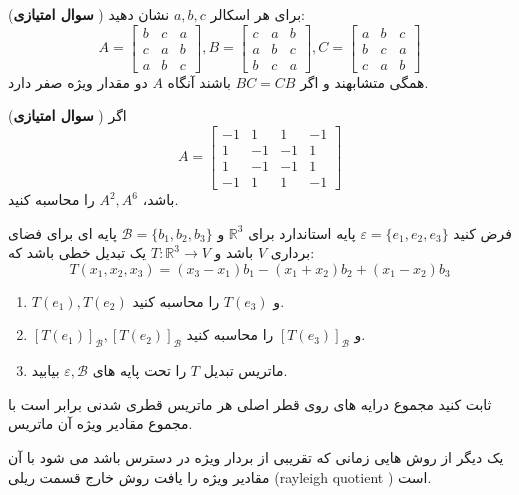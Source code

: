 \documentclass{article}
\begin{document}
	
	({\bf سوال امتیازی })
	برای هر اسکالر 
	$a,b,c$
	نشان دهید:
	$$A=\begin{bmatrix}
	b&c&a\\
	c&a&b\\
	a&b&c
	
	\end{bmatrix},
	B=\begin{bmatrix}
	c&a&b\\
	a&b&c\\
	b&c&a
	
	\end{bmatrix}
	,C=
	\begin{bmatrix}
	a&b&c\\
	b&c&a\\
	c&a&b
	\end{bmatrix}
	$$
	همگی متشابهند و اگر
	$BC=CB$
	باشند آنگاه 
	$A$
	دو مقدار ویژه صفر دارد.
	
	
	
	({\bf سوال امتیازی })
	اگر 
	$$A=
	\begin{bmatrix}
	-1&1&1&-1\\
	1&-1&-1&1\\
	1&-1&-1&1\\
	-1&1&1&-1
	\end{bmatrix}$$
	باشد،
	$A^2,A^6$
	را محاسبه کنید.
	
	
	فرض کنید
	$\varepsilon=\{e_1,e_2,e_3\}$
	پایه استاندارد برای 
	$\mathbb{R}^3$
	و 
	$\mathcal{B}=\{b_1,b_2,b_3\}$
	پایه ای برای فضای برداری 
	$V$
	باشد و 
	$T:\mathbb{R}^3\longrightarrow V$
	یک تبدیل خطی باشد که:
	$$T(x_1,x_2,x_3)=(x_3-x_1)b_1-(x_1+x_2)b_2+(x_1-x_2)b_3$$
	\begin{enumerate}
		\item 
		$T(e_1),T(e_2)$
		و 
		$T(e_3)$
		را محاسبه کنید.
		\item 
		$[T(e_1)]_{\mathcal{B}},[T(e_2)]_{\mathcal{B}}$
		و 
		$[T(e_3)]_{\mathcal{B}}$
		را محاسبه کنید.
		\item 
		ماتریس تبدیل 
		$T$
		را تحت پایه های 
		$\varepsilon,\mathcal{B}$
		بیابید.
		
		
		
	\end{enumerate}
	
	
	ثابت کنید مجموع درایه های روی قطر اصلی هر ماتریس قطری شدنی برابر است با مجموع مقادیر ویژه آن ماتریس.
	
	
	
	 یک دیگر از روش هایی  زمانی که تقریبی از بردار ویژه در دسترس باشد می شود با آن مقادیر ویژه را یافت 
	روش خارج قسمت ریلی 
	({\lr rayleigh quotient })
	است. 
	
\end{document}
